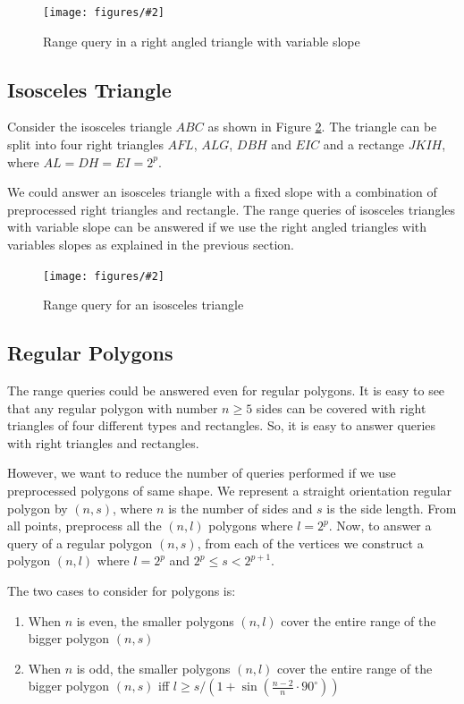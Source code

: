 \documentclass{article}
\newcommand{\addpicture}[4]
{ \begin{figure}[H] \centering \texttt{[image: figures/\#2]} \caption{#4} \label{#3}  \end{figure} }
\begin{document}
\addpicture{width=1.2in}{righttrianglevariable.png}{righttrianglevariable}{Range query in a right angled triangle with variable slope}

\subsection{Isosceles Triangle}
Consider the isosceles triangle $ABC$ as shown in Figure \ref{isosceles}. The triangle can be split into four right triangles $AFL$, $ALG$, $DBH$ and $EIC$ and a rectange $JKIH$, where $AL = DH = EI = 2^p$.

We could answer an isosceles triangle with a fixed slope with a combination of preprocessed right triangles and rectangle. The range queries of isosceles triangles with variable slope can be answered if we use the right angled triangles with variables slopes as explained in the previous section.

\addpicture{width=1.1in}{isoscelestriangle.png}{isosceles}{Range query for an isosceles triangle}

\subsection{Regular Polygons}
The range queries could be answered even for regular polygons. It is easy to see that any regular polygon with number  $n \ge 5$ sides can be covered with right triangles of four different types and rectangles. So, it is easy to answer queries with right triangles and rectangles.

However, we want to reduce the number of queries performed if we use preprocessed polygons of same shape. We represent a straight orientation regular polygon by $(n, s)$, where $n$ is the number of sides and $s$ is the side length.  From all points, preprocess all the $(n, l)$ polygons where $l = 2^p$. Now, to answer a query of a regular polygon $(n, s)$, from each of the vertices we construct a polygon $(n, l)$ where $l = 2^p$ and $2^{p} \le s < 2^{p+1}$. 

The two cases to consider for polygons is:
\begin{enumerate}
\item When $n$ is even, the smaller polygons $(n,l)$ cover the entire range of the bigger polygon $(n,s)$
\item When $n$ is odd, the smaller polygons $(n,l)$ cover the entire range of the bigger polygon $(n,s)$ iff $l \ge s / \left( 1+\sin \left( \frac{n-2}{n} \cdot 90^{\circ} \right) \right)$
\end{enumerate}
\end{document}
